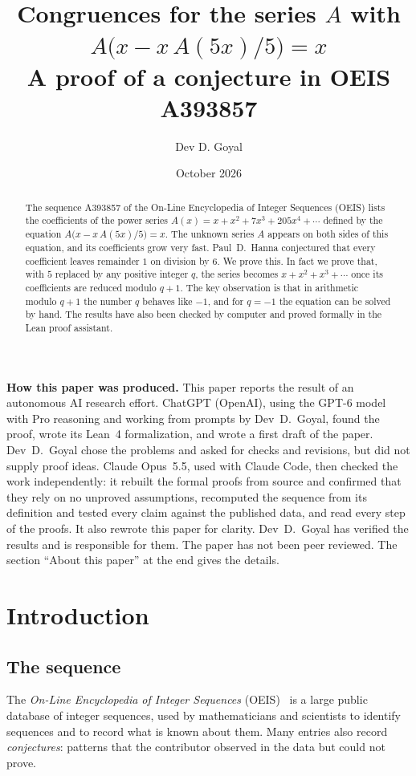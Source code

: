 \documentclass[11pt,a4paper]{article}
\title{Congruences for the series $A$ with $A\bigl(x-x\,A(5x)/5\bigr)=x$\\[6pt]\large A proof of a conjecture in OEIS A393857}
\author{Dev D. Goyal}
\date{October 2026}
\theoremstyle{definition}
\theoremstyle{remark}
\begin{document}
\maketitle
\begin{abstract}
The sequence A393857 of the On-Line Encyclopedia of Integer Sequences (OEIS) lists the coefficients of the power
series $A(x)=x+x^2+7x^3+205x^4+\cdots$ defined by the equation
$A\bigl(x-x\,A(5x)/5\bigr)=x$. The unknown series $A$ appears on both sides of this equation, and its coefficients grow very fast.
Paul~D.~Hanna conjectured that every coefficient leaves remainder $1$ on division by $6$. We prove this. In fact we prove that, with $5$ replaced by any positive integer $q$, the series becomes $x+x^2+x^3+\cdots$ once its coefficients are reduced modulo $q+1$. The key observation is that in arithmetic modulo $q+1$ the number $q$ behaves like $-1$, and
for $q=-1$ the equation can be solved by hand. The results have also been checked by computer and proved formally in the
Lean proof assistant.
\end{abstract}
\begin{center}\begin{minipage}{0.88\linewidth}\small
\textbf{How this paper was produced.} This paper reports the result of an autonomous AI research effort.
ChatGPT (OpenAI), using the GPT-6 model with Pro reasoning and working from prompts by Dev~D.~Goyal, found the proof, wrote its Lean~4 formalization, and wrote a first draft of the paper.
Dev~D.~Goyal chose the problems and asked for checks and revisions, but did not supply proof ideas.
Claude Opus~5.5, used with Claude Code, then checked the work independently: it rebuilt the formal proofs from
source and confirmed that they rely on no unproved assumptions, recomputed the sequence from its definition and tested
every claim against the published data, and read every step of the proofs. It also rewrote this paper for clarity.
Dev~D.~Goyal has verified the results and is responsible for them. The paper has not been peer reviewed.
The section ``About this paper'' at the end gives the details.
\end{minipage}\end{center}

\section{Introduction}

\subsection{The sequence}\label{sec:sequence}
The \emph{On-Line Encyclopedia of Integer Sequences} (OEIS)~\cite{oeisdb} is a large public database of integer
sequences, used by mathematicians and scientists to identify sequences and to record what is known about them. Many
entries also record \emph{conjectures}: patterns that the contributor observed in the data but could not prove.
\end{document}
